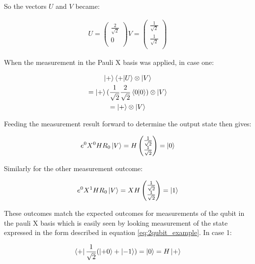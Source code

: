 So the vectors $U$ and $V$ became:

\begin{align}
U =
\begin{pmatrix}
\frac{2}{\sqrt{2}} \\
0 \\
\end{pmatrix}
V =
\begin{pmatrix}
\frac{1}{\sqrt{2}} \\
\frac{1}{\sqrt{2}} \\
\end{pmatrix}
\end{align}

When the measurement in the Pauli X basis was applied, in case one:

\begin{multline}
\ket{+} \braket{+|U} \otimes \ket{V} \\
= \ket{+} (\frac{1}{\sqrt{2}}\frac{2}{\sqrt{2}} \braket{0|0}) \otimes \ket{V} \\
= \ket{+} \otimes \ket{V} \\
\end{multline}

Feeding the measurement result forward to determine the output state then gives:

\begin{equation}
e^{0} X^{0} H R_{0} \ket{V}
= H
\begin{pmatrix}
\frac{1}{\sqrt{2}} \\
\frac{1}{\sqrt{2}} \\
\end{pmatrix}
= \ket{0}
\end{equation}

Similarly for the other measurement outcome:

\begin{equation}
e^{0} X^{1} H R_{0} \ket{V}
=  X H
\begin{pmatrix}
\frac{1}{\sqrt{2}} \\
\frac{1}{\sqrt{2}} \\
\end{pmatrix}
= \ket{1}
\end{equation}

These outcomes match the expected outcomes for measurements of the qubit in the pauli X basis which is easily seen by looking measurement of the state expressed in the form described in equation \eqref{eq:2qubit_example}. In case 1:

\begin{equation}
\label{eq:m_outcome_1}
\bra{+} \frac{1}{\sqrt{2}} (\ket{+ 0} + \ket{- 1}) = \ket{0} = H \ket{+}
\end{equation}

